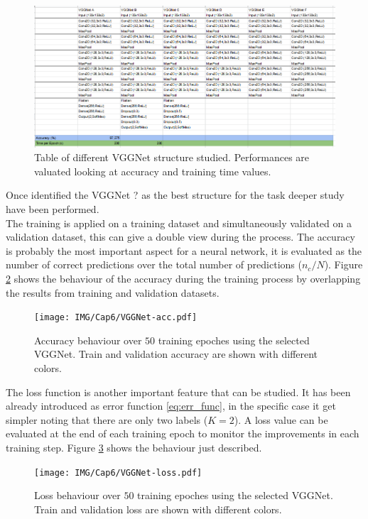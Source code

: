 \begin{figure}
	\centering
	\includegraphics[width=1.\textwidth]{IMG/Cap6/VGGNet-Tab.png}
	\caption{Table of different VGGNet structure studied. Performances are valuated looking at accuracy and training time values.}
	\label{fig:VGGNet-tested}
\end{figure}

Once identified the VGGNet ? as the best structure for the task deeper study have been performed.\\
The training is applied on a training dataset and simultaneously validated on a validation dataset, this can give a double view during the process.
The accuracy is probably the most important aspect for a neural network, it is evaluated as the number of correct predictions over the total number of predictions ($n_c/N$). Figure \ref{fig:VGGNet-acc} shows the behaviour of the accuracy during the training process by overlapping the results from training and validation datasets.\\

\begin{figure}
	\centering
	\texttt{[image: IMG/Cap6/VGGNet-acc.pdf]}
	\caption{Accuracy behaviour over $50$ training epoches using the selected VGGNet. Train and validation accuracy are shown with different colors.}
	\label{fig:VGGNet-acc}
\end{figure}

The loss function is another important feature that can be studied. It has been already introduced as error function \ref{eq:err_func}, in the specific case it get simpler noting that there are only two labels ($K = 2$). A loss value can be evaluated at the end of each training epoch to monitor the improvements in each training step. Figure \ref{fig:VGGNet-loss} shows the behaviour just described.\\

\begin{figure}
	\centering
	\texttt{[image: IMG/Cap6/VGGNet-loss.pdf]}
	\caption{Loss behaviour over $50$ training epoches using the selected VGGNet. Train and validation loss are shown with different colors.}
	\label{fig:VGGNet-loss}
\end{figure}

